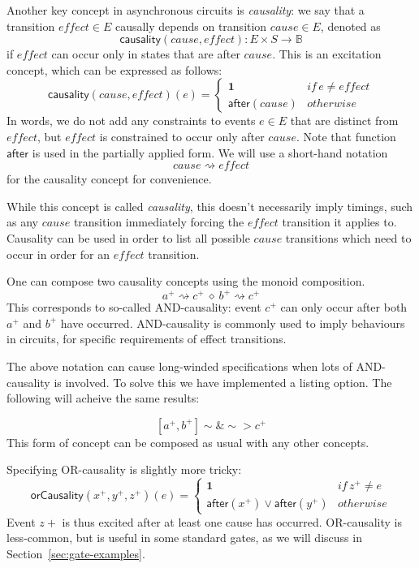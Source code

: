 \documentclass[british, journal]{IEEEtran}
\begin{document}
Another key concept in asynchronous circuits is \emph{causality}:
we say that a transition $\mathit{effect}\in E$ causally depends
on transition $\mathit{cause}\in E$, denoted as
\[
\mathsf{causality}(\mathit{cause},\mathit{effect}):E\times
S\rightarrow\mathbb{B}
\]
 if $\mathit{effect}$ can occur only in states that are after $\mathit{cause}$.
This is an excitation concept, which can be expressed as follows:
\[
\mathsf{causality}(\mathit{cause},\mathit{effect})(e)\!=\!\begin{cases}
\mathbf{1} & \mathit{if}\, e\neq\mathit{effect}\\
\mathsf{after}(cause) & \mathit{otherwise}
\end{cases}
\]
In words, we do not add any constraints to events $e\in E$ that are
distinct from $\mathit{effect}$, but $\mathit{effect}$ is constrained
to occur only after $\mathit{cause}$. Note that function $\mathsf{after}$
is used in the partially applied form. We will use a short-hand notation
\[
\mathit{cause}\rightsquigarrow\mathit{effect}
\]
for the causality concept for convenience.
 
While this concept is called \emph{causality}, this doesn't necessarily imply
timings, such as any $\mathit{cause}$ transition immediately forcing the
 $\mathit{effect}$ transition it applies to. Causality can be used in order to
list all possible $\mathit{cause}$ transitions which need to occur in order
 for an $\mathit{effect}$ transition.

One can compose two causality concepts using the monoid composition.
\[
a^{+}\rightsquigarrow c^{+}\ \diamond\ b^{+}\rightsquigarrow c^{+}
\]
This corresponds to so-called AND-causality: event $c^{+}$ can only occur
after both $a^{+}$ and $b^{+}$ have occurred. AND-causality is commonly used
to imply behaviours in circuits, for specific requirements of effect transitions.  

The above notation can cause long-winded specifications when lots of AND-causality is involved. 
To solve this we have implemented a listing option. The following will acheive the same results:

\[
[a^{+}, b^{+}]\sim\&\sim>c^{+}
\]
This form of concept can be composed as usual with any other concepts.

Specifying OR-causality is slightly more tricky:
\[
\mathsf{orCausality}(x^{+},y^{+},z^{+})(e)=\begin{cases}
\mathbf{1} & \mathit{if}\, z^{+}\neq\mathit{e}\\
\mathsf{after}(x^{+})\vee\mathsf{after}(y^{+}) & \mathit{otherwise}
\end{cases}
\]
Event $z+$ is thus excited after at least one cause has occurred. OR-causality is less-common,
but is useful in some standard gates, as we will discuss in Section~\ref{sec:gate-examples}.
\end{document}
